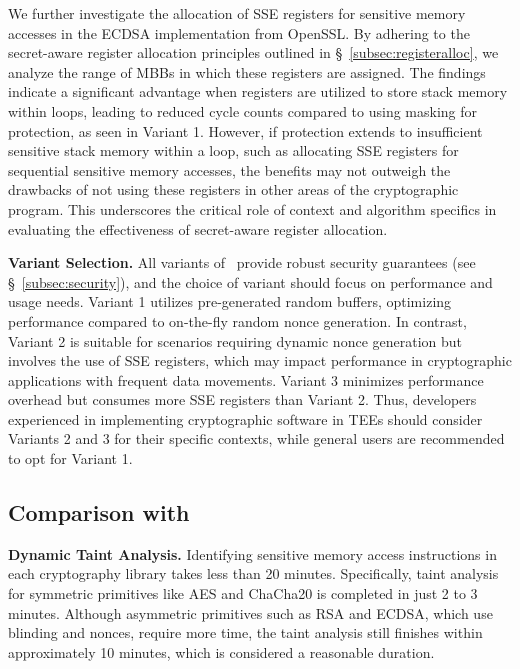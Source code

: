 We further investigate the allocation of SSE registers for sensitive memory accesses in the ECDSA implementation from OpenSSL. By adhering to the secret-aware register allocation principles outlined in \S~\ref{subsec:registeralloc}, we analyze the range of MBBs in which these registers are assigned.
The findings indicate a significant advantage when registers are utilized to store stack memory within loops, leading to reduced cycle counts compared to using masking for protection, as seen in Variant 1. 
However, if protection extends to insufficient sensitive stack memory within a loop, such as allocating SSE registers for sequential sensitive memory accesses, the benefits may not outweigh the drawbacks of not using these registers in other areas of the cryptographic program. 
This underscores the critical role of context and algorithm specifics in evaluating the effectiveness of secret-aware register allocation.

\noindent \textbf{Variant Selection.}
All variants of \tool\ provide robust security guarantees (see \S~\ref{subsec:security}), and the choice of variant should focus on performance and usage needs. 
Variant 1 utilizes pre-generated random buffers, optimizing performance compared to on-the-fly random nonce generation. In contrast, Variant 2 is suitable for scenarios requiring dynamic nonce generation but involves the use of SSE registers, which may impact performance in cryptographic applications with frequent data movements. 
Variant 3 minimizes performance overhead but consumes more SSE registers than Variant 2. 
Thus, developers experienced in implementing cryptographic software in TEEs should consider Variants 2 and 3 for their specific contexts, while general users are recommended to opt for Variant 1.

\subsection{Comparison with \ftool}
\label{subsec:ftool}

\noindent \textbf{Dynamic Taint Analysis.}
Identifying sensitive memory access instructions in each cryptography library takes less than 20 minutes. 
Specifically, taint analysis for symmetric primitives like AES and ChaCha20 is completed in just 2 to 3 minutes. 
Although asymmetric primitives such as RSA and ECDSA, which use blinding and nonces, require more time, the taint analysis still finishes within approximately 10 minutes, which is considered a reasonable duration.

